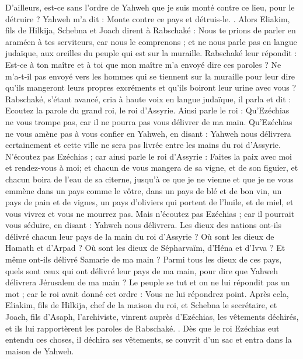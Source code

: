 \begin{multicols}{2}
D'ailleurs, est-ce sans l'ordre de Yahweh que je suis monté contre ce lieu, pour le détruire ? Yahweh m'a dit : Monte contre ce pays et détruis-le.
.
Alors Eliakim, fils de Hilkija, Schebna et Joach dirent à Rabschaké : Nous te prions de parler en araméen à tes serviteurs, car nous le comprenons ; et ne nous parle pas en langue judaïque, aux oreilles du peuple qui est sur la muraille.
Rabschaké leur répondit : Est-ce à ton maître et à toi que mon maître m'a envoyé dire ces paroles ? Ne m'a-t-il pas envoyé vers les hommes qui se tiennent sur la muraille pour leur dire qu'ils mangeront leurs propres excréments et qu'ils boiront leur urine avec vous ?
Rabschaké, s'étant avancé, cria à haute voix en langue judaïque, il parla et dit : Ecoutez la parole du grand roi, le roi d'Assyrie.
Ainsi parle le roi : Qu'Ezéchias ne vous trompe pas, car il ne pourra pas vous délivrer de ma main.
Qu'Ezéchias ne vous amène pas à vous confier en Yahweh, en disant : Yahweh nous délivrera certainement et cette ville ne sera pas livrée entre les mains du roi d'Assyrie.
N'écoutez pas Ezéchias ; car ainsi parle le roi d'Assyrie : Faites la paix avec moi et rendez-vous à moi; et chacun de vous mangera de sa vigne, et de son figuier, et chacun boira de l'eau de sa citerne,
jusqu'à ce que je ne vienne et que je ne vous emmène dans un pays comme le vôtre, dans un pays de blé et de bon vin, un pays de pain et de vignes, un pays d'oliviers qui portent de l'huile, et de miel, et vous vivrez et vous ne mourrez pas. Mais n'écoutez pas Ezéchias ; car il pourrait vous séduire, en disant : Yahweh nous délivrera.
Les dieux des nations ont-ils délivré chacun leur pays de la main du roi d'Assyrie ?
Où sont les dieux de Hamath et d'Arpad ? Où sont les dieux de Sépharvaïm, d'Héna et d'Ivva ? Et même ont-ils délivré Samarie de ma main ?
Parmi tous les dieux de ces pays, quels sont ceux qui ont délivré leur pays de ma main, pour dire que Yahweh délivrera Jérusalem de ma main ?
Le peuple se tut et on ne lui répondit pas un mot ; car le roi avait donné cet ordre : Vous ne lui répondrez point.
Après cela, Eliakim, fils de Hilkija, chef de la maison du roi, et Schebna le secrétaire, et Joach, fils d'Asaph, l'archiviste, vinrent auprès d'Ezéchias, les vêtements déchirés, et ils lui rapportèrent les paroles de Rabschaké.
.
\VerseOne{}Dès que le roi Ezéchias eut entendu ces choses, il déchira ses vêtements, se couvrit d'un sac et entra dans la maison de Yahweh.

\end{multicols}
